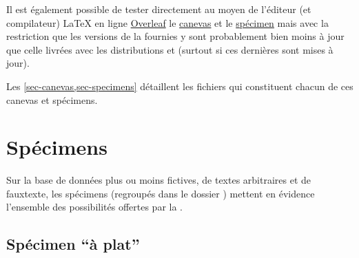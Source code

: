 Il est également possible de tester directement au moyen de l'éditeur (et
compilateur) \LaTeX{} en ligne%
%
%
%
%
\href{https://www.overleaf.com/}{Overleaf} le
\href{https://www.overleaf.com/latex/templates/template-of-a-thesis-written-with-yathesis-class/nhtmtthnqwtd}{canevas}
et le
\href{https://www.overleaf.com/latex/examples/sample-of-a-thesis-written-with-yathesis-class/nbcfvfqgnjfq}{spécimen}\enarborescence{}
mais avec la restriction que les versions de la \yatCl fournies y sont
probablement bien moins à jour que celle livrées avec les distributions
\texlive{} et \miktex{} (surtout si ces dernières sont mises à jour).

Les \vref{sec-canevas,sec-specimens} détaillent les fichiers qui constituent
chacun de ces canevas et spécimens.




\section{Spécimens}
\label{sec-specimens}

Sur la base de données plus ou moins fictives, de textes arbitraires et de
\gls{fauxtexte}, les spécimens (regroupés dans le dossier )
mettent en évidence l'ensemble des possibilités offertes par la \yatCl{}.

\subsection{Spécimen \enquote{à plat}}
\label{sec-specimen-a-plat}
%

